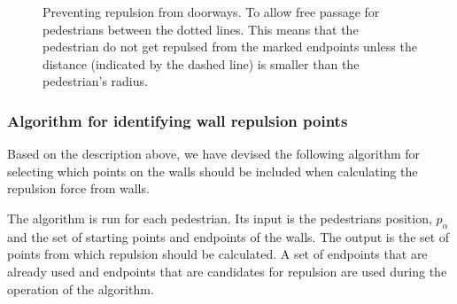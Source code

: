 \begin{figure}[h]
    \centering

    \caption[Preventing repulsion from doorways]{Preventing repulsion from 
    doorways. To allow free passage for pedestrians between the 
    dotted lines. This means that the pedestrian do not get repulsed from the marked endpoints unless the 
    distance (indicated by the dashed line) is smaller than the pedestrian's 
    radius.}
    \label{fig:doorways}
\end{figure}

\subsubsection{Algorithm for identifying wall repulsion points}
\label{sec:repulsion-points-algorithm}
Based on the description above, we have devised the following algorithm for 
selecting which points on the walls should be included when calculating the 
repulsion force from walls.

The algorithm is run for each pedestrian. Its input is the pedestrians 
position, $p_\alpha$ and the set of starting points and endpoints of the 
walls. The output is the set of points from which repulsion should be calculated. A 
set of endpoints that are already used and endpoints that are candidates for 
repulsion are used during the operation of the algorithm.

